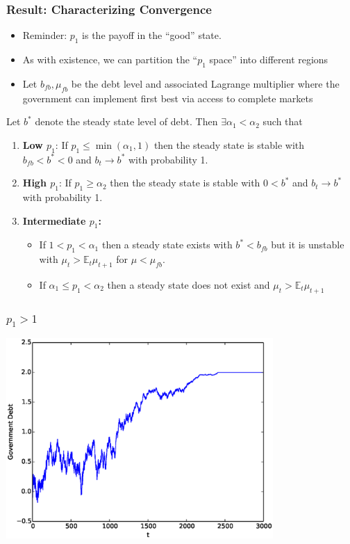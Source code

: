 \documentclass{beamer}
\newcommand{\EE}{\mathbb E}
\begin{document}
 \begin{frame}
  \frametitle{Result: Characterizing Convergence}

  \begin{itemize}
  \item Reminder:  $p_1$ is the payoff in the ``good'' state.
   \item As with existence, we can partition  the ``$p_1$ space'' into different regions
   \item Let $b_{fb},\mu_{fb}$ be the debt level and associated Lagrange multiplier where the government can implement first best via  access to complete markets
  \end{itemize}
  \small
 	\begin{theorem}
Let $b^*$ denote the steady state level of debt.  Then $\exists  \alpha_1 < \alpha_2$ such that
		\begin{enumerate}
			\item  \textbf{Low $p_1$}: If $p_1\leq\min(\alpha_1,1)$ then the steady state is stable with $b_{fb}<b^*<0$ and $b_t\rightarrow b^*$ with probability 1.
			\item \textbf{High  $p_1$}:  If $p_1 \geq \alpha_2$ then the steady state is stable with $0<b^*$ and $b_t \rightarrow b^*$ with probability 1.
			\item \textbf{Intermediate $p_1$:}
			\begin{itemize}
			  \item  If $1 < p_1 <\alpha_1$ then a steady state exists with $b^* < b_{fb}$ but it is unstable with $\mu_t >\EE_t \mu_{t+1}$ for $\mu < \mu_{fb}$.
			\item  If $\alpha_1\leq p_1<\alpha_2$ then a steady state does not exist and $\mu_t > \EE_t\mu_{t+1}$
			\end{itemize}
		
		\end{enumerate}
	\end{theorem}
 \end{frame}

 \begin{frame}

	\frametitle{$p_1 > 1$}
	\begin{center}
	\includegraphics[width=4in]{Images/port1.eps}
	\end{center}
\end{frame}
\end{document}
